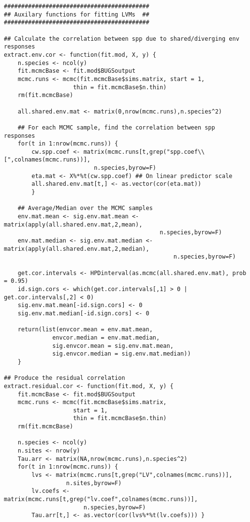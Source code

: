 \begin{verbatim}
##########################################
## Auxilary functions for fitting LVMs  ##
##########################################

## Calculate the correlation between spp due to shared/diverging env responses
extract.env.cor <- function(fit.mod, X, y) {		
	n.species <- ncol(y)
	fit.mcmcBase <- fit.mod$BUGSoutput
	mcmc.runs <- mcmc(fit.mcmcBase$sims.matrix, start = 1, 
                    thin = fit.mcmcBase$n.thin) 
	rm(fit.mcmcBase)
		
	all.shared.env.mat <- matrix(0,nrow(mcmc.runs),n.species^2)

	## For each MCMC sample, find the correlation between spp responses
	for(t in 1:nrow(mcmc.runs)) { 
		cw.spp.coef <- matrix(mcmc.runs[t,grep("spp.coef\\[",colnames(mcmc.runs))],
                          n.species,byrow=F)
		eta.mat <- X%*%t(cw.spp.coef) ## On linear predictor scale
		all.shared.env.mat[t,] <- as.vector(cor(eta.mat))
		}

	## Average/Median over the MCMC samples
	env.mat.mean <- sig.env.mat.mean <- matrix(apply(all.shared.env.mat,2,mean),
                                             n.species,byrow=F)
	env.mat.median <- sig.env.mat.median <- matrix(apply(all.shared.env.mat,2,median),
                                                 n.species,byrow=F)
		
	get.cor.intervals <- HPDinterval(as.mcmc(all.shared.env.mat), prob = 0.95)	
	id.sign.cors <- which(get.cor.intervals[,1] > 0 | get.cor.intervals[,2] < 0)	
	sig.env.mat.mean[-id.sign.cors] <- 0
	sig.env.mat.median[-id.sign.cors] <- 0
	
	return(list(envcor.mean = env.mat.mean, 
              envcor.median = env.mat.median, 
              sig.envcor.mean = sig.env.mat.mean, 
              sig.envcor.median = sig.env.mat.median))
	}
	
## Produce the residual correlation
extract.residual.cor <- function(fit.mod, X, y) {
	fit.mcmcBase <- fit.mod$BUGSoutput
	mcmc.runs <- mcmc(fit.mcmcBase$sims.matrix, 
                    start = 1, 
                    thin = fit.mcmcBase$n.thin)
	rm(fit.mcmcBase)

	n.species <- ncol(y)
	n.sites <- nrow(y)
	Tau.arr <- matrix(NA,nrow(mcmc.runs),n.species^2)
	for(t in 1:nrow(mcmc.runs)) { 
		lvs <- matrix(mcmc.runs[t,grep("LV",colnames(mcmc.runs))],
                  n.sites,byrow=F)
		lv.coefs <- matrix(mcmc.runs[t,grep("lv.coef",colnames(mcmc.runs))],
                       n.species,byrow=F)
		Tau.arr[t,] <- as.vector(cor(lvs%*%t(lv.coefs))) }
		

\end{verbatim}
